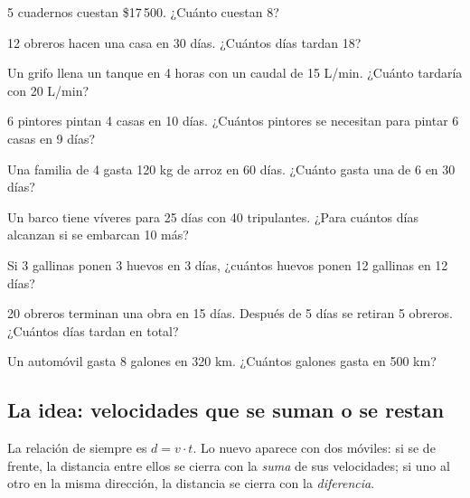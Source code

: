\taller
{}
\begin{ejercicios}
\item 5 cuadernos cuestan \$17\,500. ¿Cuánto cuestan 8? 
\item 12 obreros hacen una casa en 30 días. ¿Cuántos días tardan 18? 
\item Un grifo llena un tanque en 4 horas con un caudal de 15 L/min. ¿Cuánto tardaría con 20 L/min? 
\end{ejercicios}
\begin{ejercicios}
\item 6 pintores pintan 4 casas en 10 días. ¿Cuántos pintores se necesitan para pintar 6 casas en 9 días? 
\item Una familia de 4 gasta 120 kg de arroz en 60 días. ¿Cuánto gasta una de 6 en 30 días? 
\item Un barco tiene víveres para 25 días con 40 tripulantes. ¿Para cuántos días alcanzan si se embarcan 10 más? 
\end{ejercicios}
\begin{ejercicios}
\item Si 3 gallinas ponen 3 huevos en 3 días, ¿cuántos huevos ponen 12 gallinas en 12 días?
\item 20 obreros terminan una obra en 15 días. Después de 5 días se retiran 5 obreros. ¿Cuántos días tardan en total?
\item Un automóvil gasta 8 galones en 320 km. ¿Cuántos galones gasta en 500 km?
\end{ejercicios}

\bitacora


\subsection{La idea: velocidades que se suman o se restan}
La relación de siempre es $d = v \cdot t$. Lo nuevo aparece con dos móviles: si se  de frente, la distancia
entre ellos se cierra con la \emph{suma} de sus velocidades; si uno  al otro en la misma dirección, la
distancia se cierra con la \emph{diferencia}.

